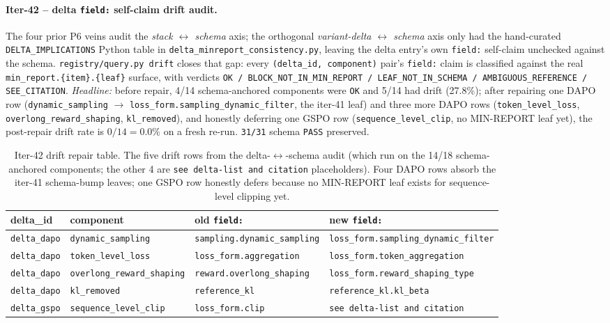 \documentclass{article}
\begin{document}
\paragraph{Iter-42 -- delta \texttt{field:} self-claim drift audit.}
The four prior P6 veins audit the \emph{stack $\leftrightarrow$ schema} axis;
the orthogonal \emph{variant-delta $\leftrightarrow$ schema} axis only had the
hand-curated \texttt{DELTA\_IMPLICATIONS} Python table in
\texttt{delta\_minreport\_consistency.py}, leaving the delta entry's
own \texttt{field:} self-claim unchecked against the schema.
\texttt{registry/query.py drift} closes that gap: every
\texttt{(delta\_id, component)} pair's \texttt{field:} claim is classified
against the real \texttt{min\_report.\{item\}.\{leaf\}} surface, with verdicts
\texttt{OK / BLOCK\_NOT\_IN\_MIN\_REPORT / LEAF\_NOT\_IN\_SCHEMA /
AMBIGUOUS\_REFERENCE / SEE\_CITATION}.
\emph{Headline:} before repair, 4/14 schema-anchored components were
\texttt{OK} and 5/14 had drift (27.8\%); after repairing one DAPO row
(\texttt{dynamic\_sampling} $\to$ \texttt{loss\_form.sampling\_dynamic\_filter},
the iter-41 leaf) and three more DAPO rows (\texttt{token\_level\_loss},
\texttt{overlong\_reward\_shaping}, \texttt{kl\_removed}), and honestly deferring
one GSPO row (\texttt{sequence\_level\_clip}, no MIN-REPORT leaf yet), the
post-repair drift rate is $0/14 = 0.0\%$ on a fresh re-run. \texttt{31/31}
schema \texttt{PASS} preserved.

\begin{table}[ht]
\centering
\small
\begin{tabular}{l l l l}
\toprule
delta\_id & component & old \texttt{field:} & new \texttt{field:} \\
\midrule
\texttt{delta\_dapo} & \texttt{dynamic\_sampling} & \texttt{sampling.dynamic\_sampling} & \texttt{loss\_form.sampling\_dynamic\_filter} \\
\texttt{delta\_dapo} & \texttt{token\_level\_loss} & \texttt{loss\_form.aggregation} & \texttt{loss\_form.token\_aggregation} \\
\texttt{delta\_dapo} & \texttt{overlong\_reward\_shaping} & \texttt{reward.overlong\_shaping} & \texttt{loss\_form.reward\_shaping\_type} \\
\texttt{delta\_dapo} & \texttt{kl\_removed} & \texttt{reference\_kl} & \texttt{reference\_kl.kl\_beta} \\
\texttt{delta\_gspo} & \texttt{sequence\_level\_clip} & \texttt{loss\_form.clip} & \texttt{see delta-list and citation} \\
\bottomrule
\end{tabular}
\caption{Iter-42 drift repair table. The five drift rows from the
delta-$\leftrightarrow$-schema audit (which run on the 14/18 schema-anchored
components; the other 4 are \texttt{see delta-list and citation} placeholders).
Four DAPO rows absorb the iter-41 schema-bump leaves; one GSPO row honestly
defers because no MIN-REPORT leaf exists for sequence-level clipping yet.}
\label{tab:p6-delta-field-drift}
\end{table}
\end{document}
